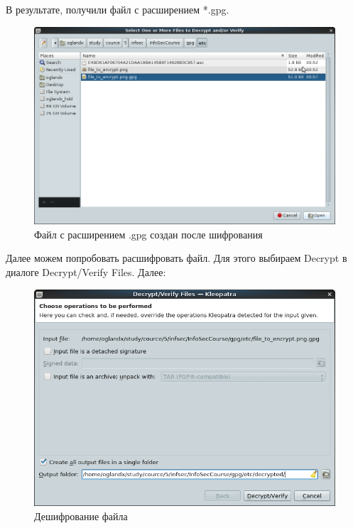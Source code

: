 \documentclass[a4paper]{article}
\begin{document}
В результате, получили файл с расширением *.gpg.

\begin{figure}[H]
	\begin{center}
		\includegraphics[scale=0.5]{pics/Screenshot at 2016-04-18 01:00:22.png}
		\caption{Файл с расширением .gpg создан после шифрования} 
		\label{pic:pic_name} %
	\end{center}
\end{figure}

Далее можем попробовать расшифровать файл. Для этого выбираем Decrypt в диалоге Decrypt/Verify Files. Далее:

\begin{figure}[H]
	\begin{center}
		\includegraphics[scale=0.5]{pics/Screenshot at 2016-04-18 01:01:11.png}
		\caption{Дешифрование файла} 
		\label{pic:pic_name} %
	\end{center}
\end{figure}
\end{document}
